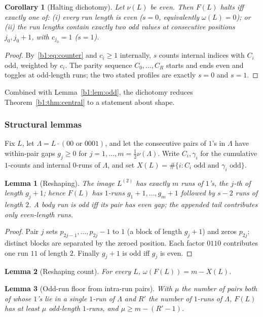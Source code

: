 \documentclass[a4paper]{article}
\theoremstyle{plain}
\newtheorem{lemma}{Lemma}[subsection]
\newtheorem{corollary}{Corollary}[subsection]
\theoremstyle{definition}
\theoremstyle{remark}
\begin{document}
\begin{corollary}[Halting dichotomy]\label{b1:cor:halting}
Let $\nu(L)$ be even. Then $F(L)$ halts iff exactly one of: (i) every run length is even ($s=0$, equivalently $\omega(L)=0$); or (ii) the run lengths contain exactly two odd values at consecutive positions $j_0,j_0+1$, with $c_{j_0}=1$ ($s=1$).
\end{corollary}
\begin{proof}
By~\eqref{b1:eq:counter} and $c_i\ge 1$ internally, $s$ counts internal indices with $C_i$ odd, weighted by $c_i$. The parity sequence $C_0,\dots,C_R$ starts and ends even and toggles at odd-length runs; the two stated profiles are exactly $s=0$ and $s=1$.
\end{proof}

Combined with Lemma~\ref{b1:lem:odd}, the dichotomy reduces Theorem~\ref{b1:thm:central} to a statement about shape.

\subsubsection{Structural lemmas}\label{b1:sec:struct}
Fix $L$, let $\Lambda=L\cdot(00\text{ or }0001)$, and let the consecutive pairs of $1$'s in $\Lambda$ have within-pair gaps $g_j\ge 0$ for $j=1,\dots,m=\tfrac12\nu(\Lambda)$. Write $C_i,\gamma_i$ for the cumulative $1$-counts and internal $0$-runs of $\Lambda$, and set $X(L)=\#\{i:C_i\text{ odd and }\gamma_i\text{ odd}\}$.

\begin{lemma}[Reshaping]\label{b1:lem:reshape}
The image $L^{(2)}$ has exactly $m$ runs of $1$'s, the $j$-th of length $g_j+1$; hence $F(L)$ has $1$-runs $g_1+1,\dots,g_m+1$ followed by $s-2$ runs of length $2$. A body run is odd iff its pair has even gap; the appended tail contributes only even-length runs.
\end{lemma}
\begin{proof}
Pair $j$ sets $p_{2j-1},\dots,p_{2j}-1$ to $1$ (a block of length $g_j+1$) and zeros $p_{2j}$; distinct blocks are separated by the zeroed position. Each factor $0110$ contributes one run $11$ of length $2$. Finally $g_j+1$ is odd iff $g_j$ is even.
\end{proof}

\begin{lemma}[Reshaping count]\label{b1:lem:reshapecount}
For every $L$, $\omega(F(L))=m-X(L)$.
\end{lemma}

\begin{lemma}[Odd-run floor from intra-run pairs]\label{b1:lem:oddrunfloor}
With $\mu$ the number of pairs both of whose $1$'s lie in a single $1$-run of $\Lambda$ and $R'$ the number of $1$-runs of $\Lambda$, $F(L)$ has at least $\mu$ odd-length $1$-runs, and $\mu\ge m-(R'-1)$.
\end{lemma}
\end{document}

